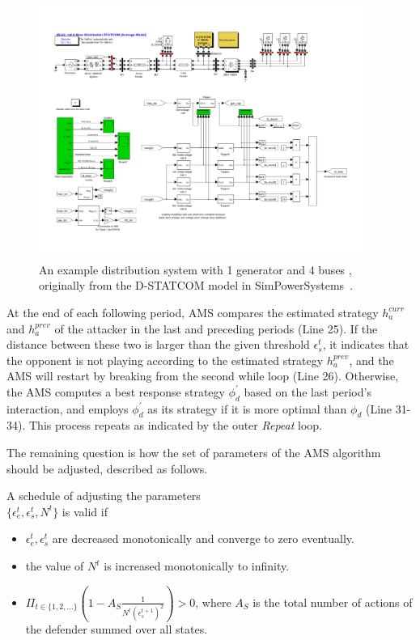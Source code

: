 \begin{figure}[t]
\setlength{\belowcaptionskip}{-10pt}
\centering
 \includegraphics[width=0.95\textwidth]{example}
\caption{\scriptsize{An example distribution system with 1 generator and 4 buses \cite{law2012security}, originally from the D-STATCOM model in SimPowerSystems~\cite{simpowersystems}.}}
 \label{fig:example}
\end{figure}

At the end of each following period, AMS compares the estimated strategy $h_a^{curr}$ and $h_a^{prev}$ of the attacker in the last and preceding periods (Line 25). If the distance between these two is larger than the given threshold $\epsilon_s^t$, it indicates that the opponent is not playing according to the estimated strategy $h_a^{prev}$, and the AMS will restart by breaking from the second while loop (Line 26). Otherwise, the AMS computes a best response strategy $\phi_d^\prime$ based on the last period's interaction, and employs $\phi_d^\prime$ as its strategy if it is more optimal than $\phi_d$ (Line 31-34). This process repeats as indicated by the outer \emph{Repeat} loop. 

The remaining question is how the set of parameters of the AMS algorithm should be adjusted, described as follows.

\begin{definition}
A schedule of adjusting the parameters \\$\{\epsilon_e^t, \epsilon_s^t, N^t\}$ is valid if
\begin{itemize}
\item $\epsilon_e^t, \epsilon_s^t$ are decreased monotonically and converge to zero eventually.
\item the value of $N^t$ is increased monotonically to infinity.
\item $\Pi_{t\in\{1,2,\ldots\}}(1 - A_S\frac{1}{N^t(\epsilon_s^{t+1})^2}) > 0$, where $A_S$ is the total number of actions of the defender summed over all states.
\end{itemize}
\end{definition}

